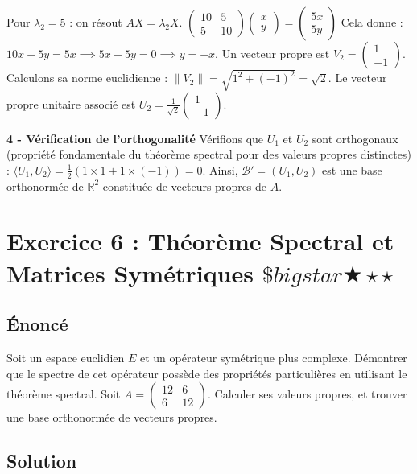 \documentclass[11pt,a4paper]{article}
\begin{document}
Pour $\lambda_2 = 5$ : on résout $AX = \lambda_2 X$.
$\begin{pmatrix} 10 & 5 \\ 5 & 10 \end{pmatrix} \begin{pmatrix} x \\ y \end{pmatrix} = \begin{pmatrix} 5x \\ 5y \end{pmatrix}$
Cela donne :
$10x + 5y = 5x \implies 5x + 5y = 0 \implies y = -x$.
Un vecteur propre est $V_2 = \begin{pmatrix} 1 \\ -1 \end{pmatrix}$.
Calculons sa norme euclidienne : $\|V_2\| = \sqrt{1^2 + (-1)^2} = \sqrt{2}$.
Le vecteur propre unitaire associé est $U_2 = \frac{1}{\sqrt{2}} \begin{pmatrix} 1 \\ -1 \end{pmatrix}$.

\textbf{4 - Vérification de l'orthogonalité}
Vérifions que $U_1$ et $U_2$ sont orthogonaux (propriété fondamentale du théorème spectral pour des valeurs propres distinctes) :
$\langle U_1, U_2 \rangle = \frac{1}{2} (1 \times 1 + 1 \times (-1)) = 0$.
Ainsi, $\mathcal{B}' = (U_1, U_2)$ est une base orthonormée de $\mathbb{R}^2$ constituée de vecteurs propres de $A$.

\newpage
\section{Exercice 6 : Théorème Spectral et Matrices Symétriques \quad $\$bigstar$\bigstar$\bigstar\star\star$}

\subsection{Énoncé}
Soit un espace euclidien $E$ et un opérateur symétrique plus complexe.
Démontrer que le spectre de cet opérateur possède des propriétés particulières en utilisant le théorème spectral.
Soit $A = \begin{pmatrix} 12 & 6 \\ 6 & 12 \end{pmatrix}$.
Calculer ses valeurs propres, et trouver une base orthonormée de vecteurs propres.

\subsection{Solution}
\end{document}
